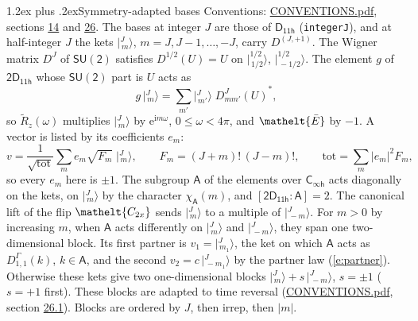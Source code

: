 \documentclass[10pt,a4paper]{article}
\makeatletter
\renewcommand\section{\@startsection{section}{1}{\z@}{-3ex plus -1ex minus -.2ex}%
  {1.2ex plus .2ex}{\normalfont\large\sffamily\bfseries\color{parttitle}}}
\numberwithin{equation}{section}
\newcommand{\eltfont}[1]{{\let\sigma\eltsigma\mathelt{#1}}}
\newcommand{\grp}[1]{\mathsf{#1}}
\newcommand{\elt}[1]{\eltfont{#1}}
\newcommand{\grpindex}[2]{[#1 : #2]}
\newcommand{\iunit}{\mathrm{i}}
\newcommand{\expe}{\mathrm{e}}
\newcommand{\irrJp}[2]{D^{(#1,#2)}}
\newcommand{\repD}[1]{D^{#1}}
\newcommand{\wignerD}[1]{D^{#1}}
\newcommand{\chiA}{\chi_{\grp{A}}}
\newcommand{\conj}[1]{{#1}^{*}}
\newcommand{\jm}[2]{\bigl\lvert{}^{#1}_{\,#2}\bigr\rangle}
\newcommand{\barred}[1]{\bar{#1}}
\newcommand{\lift}[1]{\tilde{#1}}
\makeatother
\begin{document}
\section{Symmetry-adapted bases}\label{s:bases}
Conventions: \href{../../CONVENTIONS.pdf}{CONVENTIONS.pdf}, sections \href{../../../rotation/CONVENTIONS.pdf\#conv.14}{14} and \href{../../CONVENTIONS.pdf\#conv.26}{26}.
\leavevmode\label{n:index.m}\label{n:vector.ket}The bases at integer $J$ are those of \href{../../../rotation/data/pdf/D11h.pdf}{$\grp{D_{11h}}$} (\texttt{integerJ}), and at half-integer $J$ the kets $\jm{J}{m}$, $m = J, J-1, \dots, -J$, carry $\irrJp{J}{+1}$. \label{n:matrix.wigner}The Wigner matrix $\wignerD{J}$ of $\grp{SU(2)}$ satisfies $\wignerD{1/2}(U) = U$ on $\jm{1/2}{1/2}$, $\jm{1/2}{-1/2}$. The element $g$ of $\grp{2D_{11h}}$ whose $\grp{SU(2)}$ part is $U$ acts as
\begin{equation}\label{e:action}g\,\jm{J}{m} = \sum_{m'} \jm{J}{m'}\; \conj{\wignerD{J}_{m m'}(U)},\end{equation}
so $\lift{R}_{z}(\omega)$ multiplies $\jm{J}{m}$ by $\expe^{\iunit m\omega}$, $0 \le \omega < 4\pi$, and $\elt{\barred{E}}$ by $-1$. \label{n:index.ketcoefficient}\label{n:vector.basis.symmetry}\label{n:index.ketweight}\label{n:index.total}A vector is listed by its coefficients $e_m$:
\begin{equation}\label{e:ket}v = \frac{1}{\sqrt{\mathrm{tot}}}\sum_m e_m\sqrt{F_m}\;\jm{J}{m},\qquad F_m = (J+m)!\,(J-m)!,\qquad \mathrm{tot} = \sum_m |e_m|^2F_m,\end{equation}
so every $e_m$ here is $\pm 1$.
\leavevmode\label{n:group.A}\label{n:function.character.abelian}The subgroup $\grp{A}$ of the elements over $\grp{C_{\infty h}}$ acts diagonally on the kets, on $\jm{J}{m}$ by the character $\chiA(m)$, and $\grpindex{\grp{2D_{11h}}}{\grp{A}} = 2$. The canonical lift of the flip $\elt{C_{2x}}$ sends $\jm{J}{m}$ to a multiple of $\jm{J}{-m}$. For $m > 0$ by increasing $m$, when $\grp{A}$ acts differently on $\jm{J}{m}$ and $\jm{J}{-m}$, they span one two-dimensional block. \label{n:index.partner.sign}Its first partner is $v_1 = \jm{J}{m_1}$, the ket on which $\grp{A}$ acts as $\repD{\Gamma}_{1,1}(k)$, $k \in \grp{A}$, and the second $v_2 = c\,\jm{J}{-m_1}$ by the partner law (\ref{e:partner}). \label{n:index.pair.sign}Otherwise these kets give two one-dimensional blocks $\jm{J}{m} + s\,\jm{J}{-m}$, $s = \pm 1$ ($s = +1$ first). These blocks are adapted to time reversal (\href{../../CONVENTIONS.pdf}{CONVENTIONS.pdf}, section \href{../../CONVENTIONS.pdf\#conv.26.1}{26.1}). Blocks are ordered by $J$, then irrep, then $|m|$.
\end{document}
